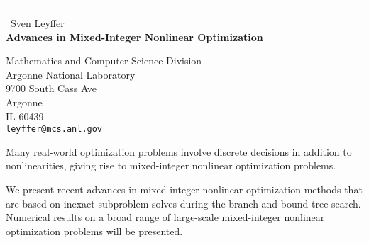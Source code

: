 \documentclass{report}
\begin{document}
\begin{center}
\rule{6in}{1pt} \
{\large Sven Leyffer \\
{\bf Advances in Mixed-Integer Nonlinear Optimization}}

Mathematics and Computer Science Division \\ Argonne National Laboratory \\ 9700 South Cass Ave \\ Argonne \\ IL 60439
\\
{\tt leyffer@mcs.anl.gov}\end{center}

Many real-world optimization problems involve discrete decisions in
addition to nonlinearities, giving rise to mixed-integer nonlinear
optimization problems.

We present recent advances in mixed-integer nonlinear optimization
methods that are based on inexact subproblem solves during the
branch-and-bound tree-search. Numerical results on a broad range of
large-scale mixed-integer nonlinear optimization problems will be
presented.
\end{document}
